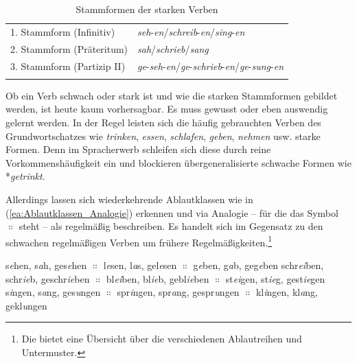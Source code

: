 \begin{table}
  \centering
  \begin{tabularx}{\textwidth}{Xl}
    \lsptoprule
    1. Stammform (Infinitiv) & \textit{seh}-\textit{en}/\textit{schreib}-\textit{en}/\textit{sing}-\textit{en} \\
    2. Stammform (Präteritum) & \textit{sah}/\textit{schrieb}/\textit{sang}\\
    3. Stammform (Partizip II) & \textit{ge}-\textit{seh}-\textit{en}/\textit{ge}-\textit{schrieb}-\textit{en}/\textit{ge}-\textit{sung}-\textit{en} \\ 
    \lspbottomrule 
  \end{tabularx}
  \caption{Stammformen der starken Verben}
  \label{tab:starke_Verben}
\end{table}

Ob ein Verb schwach oder stark ist und wie die starken Stammformen gebildet werden, ist heute kaum vorhersagbar. Es muss gewusst oder eben auswendig gelernt werden. In der Regel leisten sich die häufig gebrauchten Verben des Grundwortschatzes wie \textit{trinken}, \textit{essen}, \textit{schlafen}, \textit{geben}, \textit{nehmen} usw. starke Formen. Denn im Spracherwerb schleifen sich diese durch reine Vorkommenshäufigkeit ein und blockieren übergeneralisierte schwache Formen wie *\textit{getrinkt}.  

Allerdings lassen sich wiederkehrende Ablautklassen wie in (\ref{ea:Ablautklassen_Analogie}) erkennen und via Analogie -- für die das Symbol $\mathrel{\Colon}$ steht -- als regelmäßig beschreiben. Es handelt sich im Gegensatz zu den schwachen regelmäßigen Verben um frühere Regelmäßigkeiten.\footnote{Die \citet[678--679, §1175,]{Duden2022} bietet eine Übersicht über die verschiedenen Ablautreihen und Untermuster.}

\ea \label{ea:Ablautklassen_Analogie}
\ea \label{ea:e_a_e} s\textit{e}hen, s\textit{a}h, ges\textit{e}hen $\mathrel{\Colon}$ l\textit{e}sen, l\textit{a}s, gel\textit{e}sen $\mathrel{\Colon}$ g\textit{e}ben, g\textit{a}b, geg\textit{e}ben
\ex \label{ex:ei_ie_ie} schr\textit{ei}ben, schr\textit{ie}b, geschr\textit{ie}ben $\mathrel{\Colon}$ bl\textit{ei}ben, bl\textit{ie}b, gebl\textit{ie}ben $\mathrel{\Colon}$ st\textit{ei}gen, st\textit{ie}g, gest\textit{ie}gen 
\ex \label{ex:i_a_u} s\textit{i}ngen, s\textit{a}ng, ges\textit{u}ngen $\mathrel{\Colon}$ spr\textit{i}ngen, spr\textit{a}ng, gespr\textit{u}ngen $\mathrel{\Colon}$ kl\textit{i}ngen, kl\textit{a}ng, gekl\textit{u}ngen
\z 
\z

